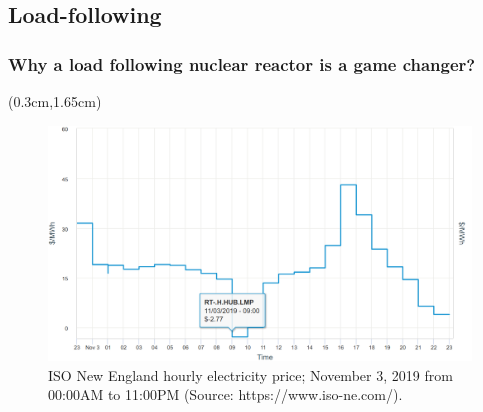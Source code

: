 \subsection{Load-following}
\begin{frame}
\frametitle{Why a load following nuclear reactor is a game changer?}
	\begin{textblock*}{12.1cm}(0.3cm,1.65cm) %
\begin{figure}[t]
	\includegraphics[width=\textwidth]{./images/ne_one_day_price.png}
		\vspace{-6mm}
	\caption{ISO New England hourly electricity price; November 3, 2019 
	from 00:00AM to 11:00PM (Source: https://www.iso-ne.com/).}
\end{figure}  
\end{textblock*}
\end{frame}

